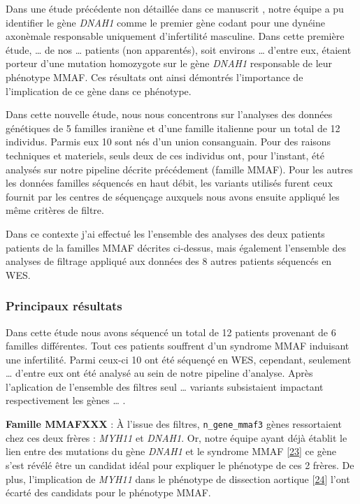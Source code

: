 \documentclass[12pt,twoside]{reedthesis}
\theoremstyle{definition}
\theoremstyle{definition}
\theoremstyle{remark}
\begin{document}
  Dans une étude précédente non détaillée dans ce manuscrit , notre équipe
  a pu identifier le gène \emph{DNAH1} comme le premier gène codant pour
  une dynéine axonèmale responsable uniquement d'infertilité masculine.
  Dans cette première étude, \ldots{} de nos \ldots{} patients (non
  apparentés), soit environs \ldots{} d'entre eux, étaient porteur d'une
  mutation homozygote sur le gène \emph{DNAH1} responsable de leur
  phénotype MMAF. Ces résultats ont ainsi démontrés l'importance de
  l'implication de ce gène dans ce phénotype.
  
  Dans cette nouvelle étude, nous nous concentrons sur l'analyses des
  données génétiques de 5 familles iraniène et d'une famille italienne
  pour un total de 12 individus. Parmis eux 10 sont nés d'un union
  consanguain. Pour des raisons techniques et materiels, seuls deux de ces
  individus ont, pour l'instant, été analysés sur notre pipeline décrite
  précédement (famille MMAF). Pour les autres les données familles
  séquencés en haut débit, les variants utilisés furent ceux fournit par
  les centres de séquençage auxquels nous avons ensuite appliqué les même
  critères de filtre.
  
  Dans ce contexte j'ai effectué les l'ensemble des analyses des deux
  patients patients de la familles MMAF décrites ci-dessus, mais également
  l'ensemble des analyses de filtrage appliqué aux données des 8 autres
  patients séquencés en WES.
  
  \newpage
  
  
  
  \newpage
  
  \subsubsection{Principaux résultats}\label{principaux-resultats-2}
  
  Dans cette étude nous avons séquencé un total de 12 patients provenant
  de 6 familles différentes. Tout ces patients souffrent d'un syndrome
  MMAF induisant une infertilité. Parmi ceux-ci 10 ont été séquençé en
  WES, cependant, seulement \ldots{} d'entre eux ont été analysé au sein
  de notre pipeline d'analyse. Après l'aplication de l'ensemble des
  filtres seul \ldots{} variants subsistaient impactant respectivement les
  gènes \ldots{} .
  
  \textbf{Famille MMAFXXX} : À l'issue des filtres,
  \texttt{n\_gene\_mmaf3} gènes ressortaient chez ces deux frères :
  \emph{MYH11} et \emph{DNAH1}. Or, notre équipe ayant déjà établit le
  lien entre des mutations du gène \emph{DNAH1} et le syndrome MMAF
  {[}\protect\hyperlink{ref-BenKhelifa2014}{23}{]} ce gène s'est révélé
  être un candidat idéal pour expliquer le phénotype de ces 2 frères. De
  plus, l'implication de \emph{MYH11} dans le phénotype de dissection
  aortique {[}\protect\hyperlink{ref-Imai2015}{24}{]} l'ont écarté des
  candidats pour le phénotype MMAF.
  
\end{document}
